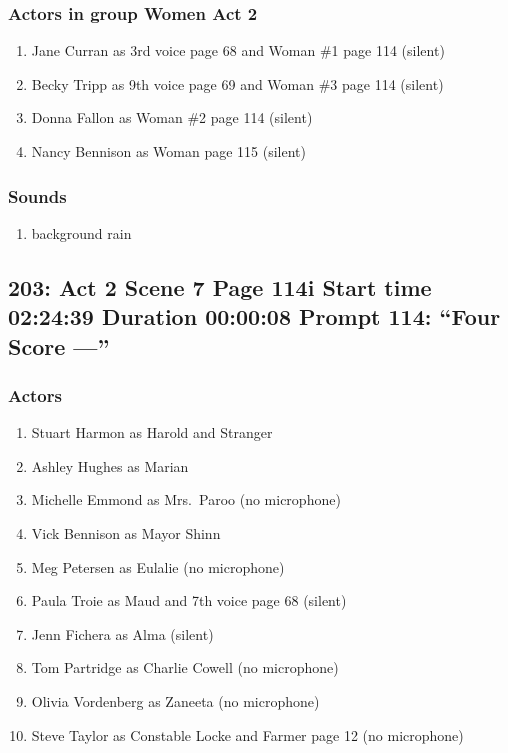 \subsubsection{Actors in group Women Act 2}
\begin{enumerate}
\item Jane Curran as 3rd voice page 68 and Woman \#1 page 114 (silent)
\item Becky Tripp as 9th voice page 69 and Woman \#3 page 114 (silent)
\item Donna Fallon as Woman \#2 page 114 (silent)
\item Nancy Bennison as Woman page 115 (silent)
\end{enumerate}

\subsubsection{Sounds}
\begin{enumerate}
\item background rain
\end{enumerate}
\subsection{203: Act 2 Scene 7 Page 114i Start time 02:24:39 Duration 00:00:08 Prompt 114: ``Four Score ---''}

\subsubsection{Actors}
\begin{enumerate}
\item Stuart Harmon as Harold and Stranger
\item Ashley Hughes as Marian
\item Michelle Emmond as Mrs.~Paroo (no microphone)
\item Vick Bennison as Mayor Shinn
\item Meg Petersen as Eulalie (no microphone)
\item Paula Troie as Maud and 7th voice page 68 (silent)
\item Jenn Fichera as Alma (silent)
\item Tom Partridge as Charlie Cowell (no microphone)
\item Olivia Vordenberg as Zaneeta (no microphone)
\item Steve Taylor as Constable Locke and Farmer page 12 (no microphone)
\end{enumerate}
